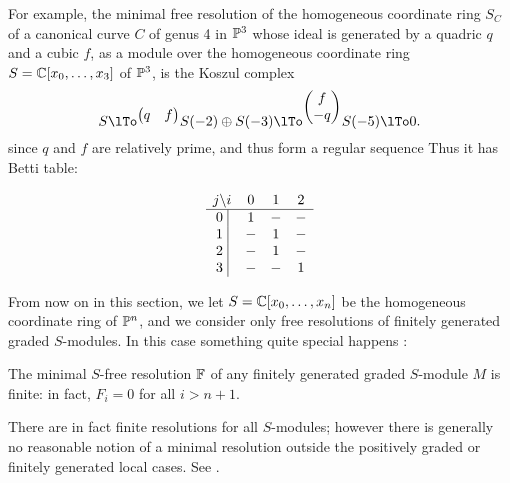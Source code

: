 \begin{example}\label{canonical in P3}
For example, the minimal free resolution of the homogeneous coordinate ring $S_{C}$ of a canonical curve $C$ of genus 4 in $\PP^{3}$ whose ideal is generated by a quadric $q$ and a cubic $f$, as a module over the homogeneous coordinate ring $S = \CC[x_{0},\dots,x_{3}]$ of $\PP^{3}$, is the Koszul complex
\small
$$
S \lTo^{
\begin{pmatrix}
  q& f
\end{pmatrix}}
S(-2) \oplus S(-3) \lTo^{
\begin{pmatrix}
f\\-q 
\end{pmatrix}
}
S(-5)\lTo 0.
$$
\normalsize
since
$q$ and $f$ are relatively prime, and thus form a regular sequence
Thus it has  Betti table:

\setcounter{MaxMatrixCols}{13}
\begin{small}
$$
\begin{matrix}
j \backslash i     &0&1&2\\ \hline
\text{0 }\vline &1&-&-\\
\text{1 }\vline &-&1&-\\
\text{2 }\vline &-&1&-\\
\text{3 }\vline &-&-&1\\
\end{matrix}
$$
\end{small}
\end{example}

From now on in this section, we let $S = \CC[x_{0},\dots, x_{n}]$ be the homogeneous coordinate ring of $\PP^{n}$, and we consider only free resolutions of finitely generated graded $S$-modules. In this case something quite special happens \cite[****]{E}:

\begin{theorem}\label{hst}
The minimal $S$-free resolution $\FF$ of any finitely generated graded $S$-module $M$ is finite: in fact, $F_{i}=0$ for all $i>n+1$.
\end{theorem}

\begin{fact}
 There are in fact finite resolutions for all $S$-modules; however there is generally no reasonable notion of a  minimal resolution outside the positively graded or finitely generated local cases. See \cite{???}.
\end{fact}


